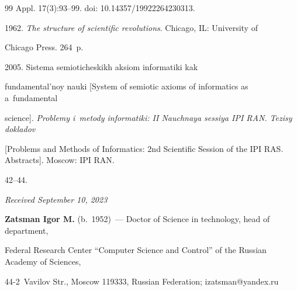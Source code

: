 {{\begin{thebibliography}{99}
{Appl.} 17(3):93--99. doi: 10.14357/19922264230313.


 1962. \textit{The structure of scientific revolutions}. Chicago, IL: University of 

Chicago Press. 264~p.


 2005. Sistema se\-mio\-ti\-che\-skikh ak\-si\-om in\-for\-ma\-ti\-ki kak  

fun\-da\-men\-tal'\-noy nau\-ki [System of semiotic axioms of informatics as a~fundamental 

science]. \textit{Problemy i~metody informatiki: II Nauchnaya sessiya IPI RAN. Tezisy dokladov} 

[Problems and Methods of Informatics: 2nd Scientific Session of the IPI RAS. Abstracts]. Moscow: IPI RAN. 

42--44.



\end{thebibliography}

} }



\vspace*{-6pt}



\hfill{\small\textit{Received September 10, 2023}} 



\vspace*{-14pt} 



\Contrl



\vspace*{-3pt}

\noindent

\textbf{Zatsman Igor M.} (b.\ 1952)~--- Doctor of Science in technology, head of department, 

Federal Research Center ``Computer Science and Control'' of the Russian Academy of Sciences,  

44-2~Vavilov Str., Moscow 119333, Russian Federation; \mbox{izatsman@yandex.ru}

  

\label{end\stat}



\renewcommand{\bibname}{\protect\rm Литература}    

